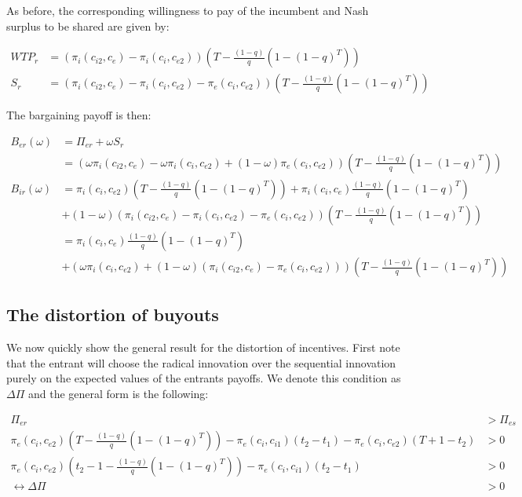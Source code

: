 \documentclass[11pt]{article}
\begin{document}
As before, the corresponding willingness to pay of the incumbent and Nash surplus to be shared are given by: 

\begin{align*}
WTP_r &= (\pi_{i}(c_{i2},c_{e})-\pi_{i}(c_{i},c_{e2})) \left( T - \frac{(1-q)}{q} \left( 1-(1-q)^T \right) \right) \\
S_r &= (\pi_{i}(c_{i2},c_{e})-\pi_{i}(c_{i},c_{e2})-\pi_{e}(c_{i},c_{e2})) \left( T - \frac{(1-q)}{q} \left( 1-(1-q)^T \right) \right)
\end{align*}

The bargaining payoff is then:

\begin{align*}
B_{er}(\omega) &= \Pi_{er}+\omega S_r \\
&= \left(\omega\pi_{i}(c_{i2},c_{e})-\omega \pi_{i}(c_{i},c_{e2})+(1-\omega)\pi_{e}(c_{i},c_{e2}) \right) \left( T - \frac{(1-q)}{q} \left( 1-(1-q)^T \right) \right) \\
B_{ir}(\omega) &=\pi_{i}(c_i,c_{e2}) \left( T - \frac{(1-q)}{q} \left( 1-(1-q)^T \right) \right)
+\pi_i(c_i,c_e) \frac{(1-q)}{q} \left( 1-(1-q)^T \right)
\\ &+(1-\omega)(\pi_{i}(c_{i2},c_{e})-\pi_{i}(c_{i},c_{e2})-\pi_{e}(c_{i},c_{e2})) \left( T - \frac{(1-q)}{q} \left( 1-(1-q)^T \right) \right) \\
&=\pi_i(c_i,c_e) \frac{(1-q)}{q} \left( 1-(1-q)^T \right)
\\ &+(\omega \pi_i(c_i,c_{e2})+(1-\omega)(\pi_{i}(c_{i2},c_{e})-\pi_{e}(c_{i},c_{e2}))) \left( T - \frac{(1-q)}{q} \left( 1-(1-q)^T \right) \right)
\end{align*}

\subsection{The distortion of buyouts}

We now quickly show the general result for the distortion of incentives. First note that the entrant will choose the radical innovation over the sequential innovation purely on the expected values of the entrants payoffs. We denote this condition as $\Delta \Pi$ and the general form is the following: 

\begin{align*}
\Pi_{er}  &> \Pi_{es}   \\
\pi_{e}(c_i,c_{e2}) \left( T - \frac{(1-q)}{q} \left( 1-(1-q)^T \right) \right) - \pi_e(c_i,c_{i1}) (t_2-t_1) -\pi_e(c_i,c_{e2})(T+1-t_2) &> 0 \\
\pi_{e}(c_i,c_{e2}) \left( t_2 -1- \frac{(1-q)}{q} \left( 1-(1-q)^T \right) \right) - \pi_e(c_i,c_{i1}) (t_2-t_1)  &> 0 \\
\leftrightarrow
\Delta \Pi &> 0
\end{align*}
\end{document}
